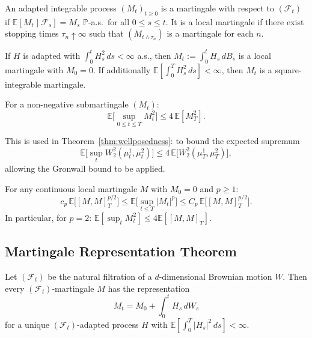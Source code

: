 \begin{definition}[Martingale]
An adapted integrable process $(M_t)_{t \geq 0}$ is a martingale with respect to
$(\mathcal{F}_t)$ if $\mathbb{E}[M_t \mid \mathcal{F}_s] = M_s$ $\mathbb{P}$-a.s.\ for
all $0 \leq s \leq t$. It is a local martingale if there exist stopping times
$\tau_n \uparrow \infty$ such that $(M_{t \wedge \tau_n})$ is a martingale for each $n$.
\end{definition}

\begin{theorem}
If $H$ is adapted with $\int_0^t H_s^2\, ds < \infty$ a.s., then
$M_t := \int_0^t H_s\, dB_s$ is a local martingale with $M_0 = 0$. If additionally
$\mathbb{E}[\int_0^T H_s^2\, ds] < \infty$, then $M_t$ is a square-integrable
martingale.
\end{theorem}

\begin{theorem}
\label{thm:doob}
For a non-negative submartingale $(M_t)$:
\[
    \mathbb{E}\Big[ \sup_{0 \leq t \leq T} M_t^2 \Big] \leq 4\, \mathbb{E}[M_T^2].
\]
\end{theorem}

\begin{remark}
This is used in Theorem~\ref{thm:wellposedness}: to bound the expected supremum
\[
    \mathbb{E}\big[\sup_t W_2^2(\mu_t^1,\mu_t^2)\big] \leq 4\,\mathbb{E}\big[W_2^2(\mu_T^1,\mu_T^2)\big],
\]
allowing the Gronwall bound to be applied.
\end{remark}

\begin{theorem}
\label{thm:bdg}
For any continuous local martingale $M$ with $M_0 = 0$ and $p \geq 1$:
\[
    c_p\, \mathbb{E}\big[[M,M]_T^{p/2}\big] \leq \mathbb{E}\Big[ \sup_{t \leq T}
    |M_t|^p \Big] \leq C_p\, \mathbb{E}\big[[M,M]_T^{p/2}\big].
\]
In particular, for $p=2$: $\mathbb{E}[\sup_t M_t^2] \leq 4\mathbb{E}[[M,M]_T]$.
\end{theorem}

\subsection{Martingale Representation Theorem}

\begin{theorem}
\label{thm:martingale-representation}
Let $(\mathcal{F}_t)$ be the natural filtration of a $d$-dimensional Brownian motion
$W$. Then every $(\mathcal{F}_t)$-martingale $M$ has the representation
\[
    M_t = M_0 + \int_0^t H_s\, dW_s
\]
for a unique $(\mathcal{F}_t)$-adapted process $H$ with
$\mathbb{E}[\int_0^T |H_s|^2\, ds] < \infty$.
\end{theorem}

